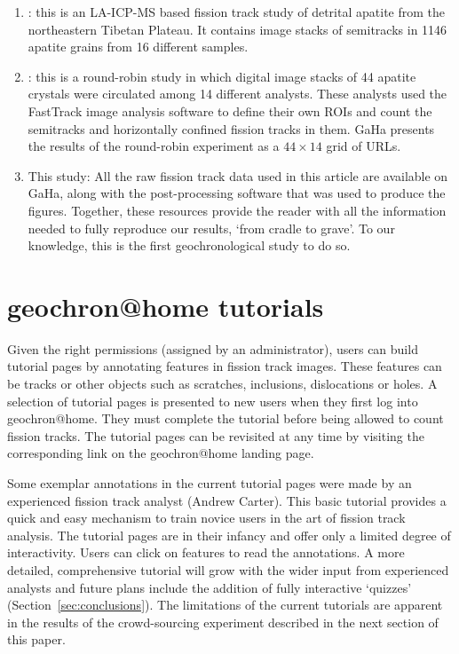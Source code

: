 \documentclass{article}
\begin{document}
\begin{enumerate}
\item{\citet{guo2025}}: this is an LA-ICP-MS based fission track study
  of detrital apatite from the northeastern Tibetan Plateau. It
  contains image stacks of semitracks in 1146 apatite grains from 16
  different samples.
\item{\citet{tamer2025}}: this is a round-robin study in which digital
  image stacks of 44 apatite crystals were circulated among 14
  different analysts. These analysts used the FastTrack image analysis
  software \citep[which is part of the Fission Track Studio
    suite;][]{gleadow2009} to define their own ROIs and count the
  semitracks and horizontally confined fission tracks in them. GaHa
  presents the results of the round-robin experiment as a
  ${44}\times{14}$ grid of URLs.
\item{This study}: All the raw fission track data used in this article
  are available on GaHa, along with the post-processing software that
  was used to produce the figures. Together, these resources provide
  the reader with all the information needed to fully reproduce our
  results, `from cradle to grave'. To our knowledge, this is the first
  geochronological study to do so.
\end{enumerate}

\section{geochron@home tutorials}\label{sec:tutorial}

Given the right permissions (assigned by an administrator), users can
build tutorial pages by annotating features in fission track images.
These features can be tracks or other objects such as scratches,
inclusions, dislocations or holes. A selection of tutorial pages is
presented to new users when they first log into
geochron@home. They must complete the tutorial before being
allowed to count fission tracks.  The tutorial pages can be revisited
at any time by visiting the corresponding link on the
geochron@home landing page.\medskip

Some exemplar annotations in the current tutorial pages were made by
an experienced fission track analyst (Andrew Carter). This basic
tutorial provides a quick and easy mechanism to train novice users in
the art of fission track analysis. The tutorial pages are in their
infancy and offer only a limited degree of interactivity. Users can
click on features to read the annotations. A more detailed,
comprehensive tutorial will grow with the wider input from experienced
analysts and future plans include the addition of fully interactive
`quizzes' (Section~\ref{sec:conclusions}). The limitations of the
current tutorials are apparent in the results of the crowd-sourcing
experiment described in the next section of this paper.
\end{document}
